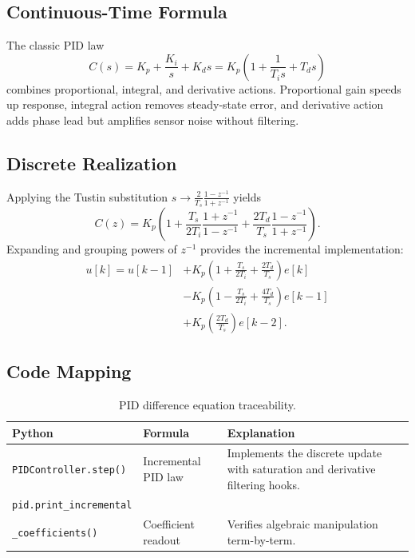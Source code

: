 \subsection{Continuous-Time Formula}
The classic PID law
\[
    C(s) = K_p + \frac{K_i}{s} + K_d s = K_p\left(1 + \frac{1}{T_i s} + T_d s\right)
\]
combines proportional, integral, and derivative actions. Proportional gain speeds up response, integral action removes steady-state error, and derivative action adds phase lead but amplifies sensor noise without filtering.

\subsection{Discrete Realization}
Applying the Tustin substitution $s \rightarrow \frac{2}{T_s} \frac{1 - z^{-1}}{1 + z^{-1}}$ yields
\[
    C(z) = K_p \left( 1 + \frac{T_s}{2T_i} \frac{1 + z^{-1}}{1 - z^{-1}} + \frac{2 T_d}{T_s} \frac{1 - z^{-1}}{1 + z^{-1}} \right).
\]
Expanding and grouping powers of $z^{-1}$ provides the incremental implementation:
\begin{align*}
    u[k] = u[k-1] &+ K_p\left(1 + \frac{T_s}{2T_i} + \frac{2T_d}{T_s}\right) e[k]\\
                  &- K_p\left(1 - \frac{T_s}{2T_i} + \frac{4T_d}{T_s}\right) e[k-1]\\
                  &+ K_p\left(\frac{2T_d}{T_s}\right) e[k-2].
\end{align*}

\subsection{Code Mapping}
\begin{table}[h]
    \centering
    \small
    \renewcommand{\arraystretch}{1.2}
    \begin{tabularx}{\linewidth}{|>{\raggedright\arraybackslash}p{4cm}|X|X|}
        \hline
        \textbf{Python} & \textbf{Formula} & \textbf{Explanation} \\
        \hline
        \texttt{PIDController.step()} & Incremental PID law & Implements the discrete update with saturation and derivative filtering hooks. \\
        \hline
        \texttt{pid.print\_incremental}\\\texttt{\_coefficients()} & Coefficient readout & Verifies algebraic manipulation term-by-term. \\
        \hline
    \end{tabularx}
    \caption{PID difference equation traceability.}
\end{table}

